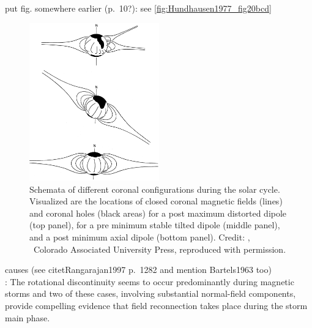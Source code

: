 put fig. somewhere earlier (p.~10?): see \autoref{fig:Hundhausen1977_fig20bcd}\\
\begin{figure}[htb]
	\centering
	\includegraphics[width=0.5\textwidth]{figures_of_others/images/Hundhausen1977_fig20bcd.png}
	\caption[Credit: {\citep[Fig.~20, panels (b--d)]{Hundhausen1977}}, \textcopyright~Colorado Associated University Press, reproduced with permission.]
	{Schemata of different coronal configurations during the solar cycle. Visualized are the locations of closed coronal magnetic fields (lines) and coronal holes (black areas) for a post maximum distorted dipole (top panel), for a pre minimum stable tilted dipole (middle panel), and a post minimum axial dipole (bottom panel). Credit: {\citep[Fig.~20, panels (b--d)]{Hundhausen1977}}, \textcopyright~Colorado Associated University Press, reproduced with permission.}
	\label{fig:Hundhausen1977_fig20bcd}
\end{figure}

causes (see citet{Rangarajan1997} p.~1282 and mention Bartels1963 too)\\

\citet{Sonnerup1967}: The rotational discontinuity seems to occur predominantly during magnetic storms and two of these cases, involving substantial normal-field components, provide compelling evidence that field reconnection takes place during the storm main phase.\\


